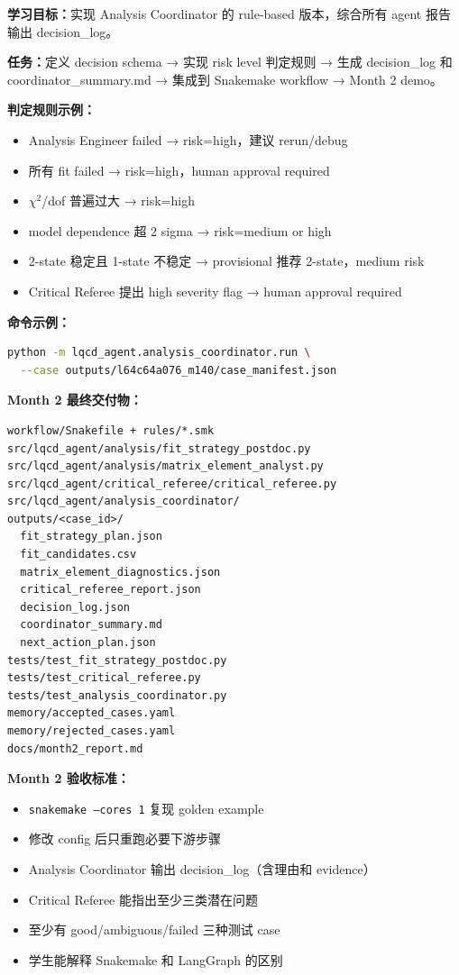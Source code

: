 \documentclass[11pt,a4paper,fontset=fandol]{ctexart}
\begin{document}
\textbf{学习目标：}实现 Analysis Coordinator 的 rule-based 版本，综合所有 agent 报告输出 decision\_log。

\textbf{任务：}定义 decision schema → 实现 risk level 判定规则 → 生成 decision\_log 和 coordinator\_summary.md → 集成到 Snakemake workflow → Month 2 demo。

\textbf{判定规则示例：}
\begin{itemize}
  \item Analysis Engineer failed → risk=high，建议 rerun/debug
  \item 所有 fit failed → risk=high，human approval required
  \item $\chi^2$/dof 普遍过大 → risk=high
  \item model dependence 超 2 sigma → risk=medium or high
  \item 2-state 稳定且 1-state 不稳定 → provisional 推荐 2-state，medium risk
  \item Critical Referee 提出 high severity flag → human approval required
\end{itemize}

\textbf{命令示例：}
\begin{lstlisting}[language=bash]
python -m lqcd_agent.analysis_coordinator.run \
  --case outputs/l64c64a076_m140/case_manifest.json
\end{lstlisting}

\textbf{Month 2 最终交付物：}
\begin{lstlisting}
workflow/Snakefile + rules/*.smk
src/lqcd_agent/analysis/fit_strategy_postdoc.py
src/lqcd_agent/analysis/matrix_element_analyst.py
src/lqcd_agent/critical_referee/critical_referee.py
src/lqcd_agent/analysis_coordinator/
outputs/<case_id>/
  fit_strategy_plan.json
  fit_candidates.csv
  matrix_element_diagnostics.json
  critical_referee_report.json
  decision_log.json
  coordinator_summary.md
  next_action_plan.json
tests/test_fit_strategy_postdoc.py
tests/test_critical_referee.py
tests/test_analysis_coordinator.py
memory/accepted_cases.yaml
memory/rejected_cases.yaml
docs/month2_report.md
\end{lstlisting}

\textbf{Month 2 验收标准：}
\begin{itemize}
  \item \texttt{snakemake --cores 1} 复现 golden example
  \item 修改 config 后只重跑必要下游步骤
  \item Analysis Coordinator 输出 decision\_log（含理由和 evidence）
  \item Critical Referee 能指出至少三类潜在问题
  \item 至少有 good/ambiguous/failed 三种测试 case
  \item 学生能解释 Snakemake 和 LangGraph 的区别
\end{itemize}
\end{document}
